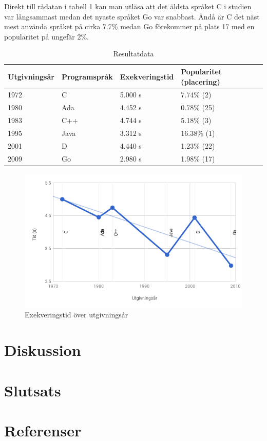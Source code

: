 \documentclass[12pt,swedish]{article}
\begin{document}
Direkt till rådatan i tabell 1 kan man utläsa att det äldsta språket C i studien var långsammast medan det nyaste språket Go var snabbast. Ändå är C det näst mest använda språket på cirka 7.7\% medan Go förekommer på plats 17 med en popularitet på ungefär 2\%.

\begin{table}[]
\centering
\caption{Resultatdata}
\label{table-result}
\begin{tabular}{@{}llll@{}}
\toprule
Utgivningsår & Programspråk & Exekveringstid & Popularitet (placering) \\ \midrule
1972         & C            & 5.000 s        & 7.74\% (2)              \\
1980         & Ada          & 4.452 s        & 0.78\% (25)             \\
1983         & C++          & 4.744 s        & 5.18\% (3)              \\
1995         & Java         & 3.312 s        & 16.38\% (1)             \\
2001         & D            & 4.440 s        & 1.23\% (22)             \\
2009         & Go           & 2.980 s        & 1.98\% (17)             \\ \bottomrule
\end{tabular}
\end{table}

\begin{figure}
    \includegraphics[width=1\textwidth,natwidth=600,natheight=371]{performance.png}
    \caption{Exekveringstid över utgivningsår}
\end{figure}

\section{Diskussion}

\section{Slutsats}

\section{Referenser}
\printbibliography
\end{document}
